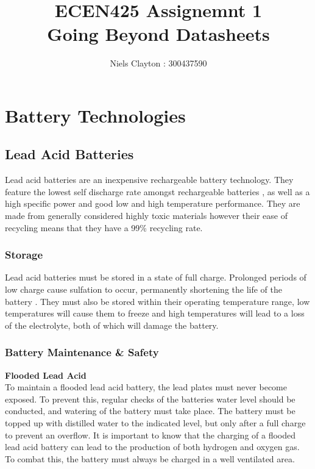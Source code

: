 \documentclass[a4paper,11pt, twocolumn]{article}
\begin{document}
\title{\LARGE{\textbf{ECEN425 Assignemnt 1}\\Going Beyond Datasheets}}
\author{Niels Clayton : 300437590}
\date{}
\maketitle

\section{Battery Technologies} 

\subsection{Lead Acid Batteries}

Lead acid batteries are an inexpensive rechargeable battery technology. They feature the lowest self discharge rate amongst rechargeable batteries \cite{lead_acid}, as well as a high specific power and good low and high temperature performance. They are made from generally considered highly toxic materials however their ease of recycling means that they have a 99\% recycling rate. 

\subsubsection{Storage}

Lead acid batteries must be stored in a state of full charge. Prolonged periods of low charge cause sulfation to occur, permanently shortening the life of the battery \cite{sulfation}. They must also be stored within their operating temperature range, low temperatures will cause them to freeze and high temperatures will lead to a loss of the electrolyte, both of which will damage the battery.

\subsubsection{Battery Maintenance \& Safety}

\textbf{Flooded Lead Acid}\\
To maintain a flooded lead acid battery, the lead plates must never become exposed. To prevent this, regular checks of the batteries water level should be conducted, and watering of the battery must take place. The battery must be topped up with distilled water to the indicated level, but only after a full charge to prevent an overflow.
It is important to know that the charging of a flooded lead acid battery can lead to the production of both hydrogen and oxygen gas. To combat this, the battery must always be charged in a well ventilated area. \\
\end{document}
